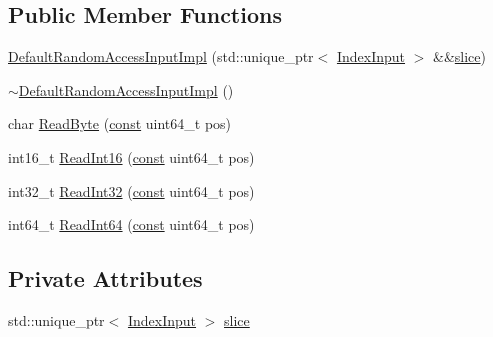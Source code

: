 \subsection*{Public Member Functions}
\begin{DoxyCompactItemize}
\item 
\mbox{\hyperlink{classlucene_1_1core_1_1store_1_1IndexInput_1_1DefaultRandomAccessInputImpl_afc7e531c6199d9066666506b23602691}{Default\+Random\+Access\+Input\+Impl}} (std\+::unique\+\_\+ptr$<$ \mbox{\hyperlink{classlucene_1_1core_1_1store_1_1IndexInput}{Index\+Input}} $>$ \&\&\mbox{\hyperlink{classlucene_1_1core_1_1store_1_1IndexInput_1_1DefaultRandomAccessInputImpl_ae9d2c6a7d3e70475ef1746ad1d2d985b}{slice}})
\item 
\mbox{\hyperlink{classlucene_1_1core_1_1store_1_1IndexInput_1_1DefaultRandomAccessInputImpl_a2255f8aa18a086bc2cd2c7412ea788c4}{$\sim$\+Default\+Random\+Access\+Input\+Impl}} ()
\item 
char \mbox{\hyperlink{classlucene_1_1core_1_1store_1_1IndexInput_1_1DefaultRandomAccessInputImpl_ae564b0bdb14f997b65195d10890cae50}{Read\+Byte}} (\mbox{\hyperlink{ZlibCrc32_8h_a2c212835823e3c54a8ab6d95c652660e}{const}} uint64\+\_\+t pos)
\item 
int16\+\_\+t \mbox{\hyperlink{classlucene_1_1core_1_1store_1_1IndexInput_1_1DefaultRandomAccessInputImpl_a5abd59fc831667fe308d5773353014dd}{Read\+Int16}} (\mbox{\hyperlink{ZlibCrc32_8h_a2c212835823e3c54a8ab6d95c652660e}{const}} uint64\+\_\+t pos)
\item 
int32\+\_\+t \mbox{\hyperlink{classlucene_1_1core_1_1store_1_1IndexInput_1_1DefaultRandomAccessInputImpl_ac0bceb35a848e41d25f1982c5fae5808}{Read\+Int32}} (\mbox{\hyperlink{ZlibCrc32_8h_a2c212835823e3c54a8ab6d95c652660e}{const}} uint64\+\_\+t pos)
\item 
int64\+\_\+t \mbox{\hyperlink{classlucene_1_1core_1_1store_1_1IndexInput_1_1DefaultRandomAccessInputImpl_ab3a8ff022f56c0c13143287089500ac4}{Read\+Int64}} (\mbox{\hyperlink{ZlibCrc32_8h_a2c212835823e3c54a8ab6d95c652660e}{const}} uint64\+\_\+t pos)
\end{DoxyCompactItemize}
\subsection*{Private Attributes}
\begin{DoxyCompactItemize}
\item 
std\+::unique\+\_\+ptr$<$ \mbox{\hyperlink{classlucene_1_1core_1_1store_1_1IndexInput}{Index\+Input}} $>$ \mbox{\hyperlink{classlucene_1_1core_1_1store_1_1IndexInput_1_1DefaultRandomAccessInputImpl_ae9d2c6a7d3e70475ef1746ad1d2d985b}{slice}}
\end{DoxyCompactItemize}


